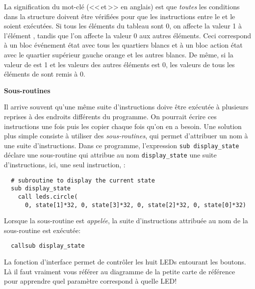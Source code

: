 La signification du mot-clé  (<<\,et\,>> en anglais) est que \emph{toutes} les conditions dans 
la structure  doivent être vérifiées pour que les instructions entre le
 et le  soient exécutées.
Si tous les éléments du tableau  sont 0, on affecte la valeur 1 à l'élément ,
tandis que l'on affecte la valeur 0 aux autres éléments.
Ceci correspond à un bloc événement état avec tous les quartiers blancs
et à un bloc action état avec le quartier supérieur gauche orange et les autres blancs.
De même, si la valeur de  est 1 et les valeurs des autres éléments est 0,
les valeurs de tous les éléments de  sont remis à 0.

\textbf{\large Sous-routines}

Il arrive souvent qu'une même suite d'instructions doive être exécutée à plusieurs reprises
à des endroits différents du programme.
On pourrait écrire ces instructions une fois puis les copier chaque fois qu'on en a besoin.
Une solution plus simple consiste à utiliser des \emph{sous-routines}, qui permet
d'attribuer un nom à une suite d'instructions.
Dans ce programme, l'expression {\footnotesize\verb+sub display_state+} déclare une
sous-routine qui attribue au nom {\footnotesize\verb+display_state+} une suite d'instructions,
ici, une seul instruction, :

\bigskip

\begin{footnotesize}
\begin{verbatim}
  # subroutine to display the current state
  sub display_state
    call leds.circle(
      0, state[1]*32, 0, state[3]*32, 0, state[2]*32, 0, state[0]*32)
\end{verbatim}
\end{footnotesize}

Lorsque la sous-routine est \emph{appelée}, la suite d'instructions attribuée au nom de la sous-routine
est exécutée:
\vspace{-1ex}
\begin{footnotesize}
\begin{verbatim}
  callsub display_state
\end{verbatim}
\end{footnotesize}
\vspace{-1ex}
La fonction d'interface  permet de contrôler les huit LEDs entourant les boutons.
Là il faut vraiment vous référer au diagramme de la petite carte de référence pour apprendre
quel paramètre correspond à quelle LED!

